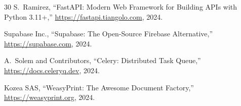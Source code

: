 \documentclass[conference]{IEEEtran}
\begin{document}
\begin{thebibliography}{30}
S.~Ramirez,
``FastAPI: Modern Web Framework for Building APIs with Python 3.11+,''
\url{https://fastapi.tiangolo.com}, 2024.

Supabase Inc.,
``Supabase: The Open-Source Firebase Alternative,''
\url{https://supabase.com}, 2024.

A.~Solem and Contributors,
``Celery: Distributed Task Queue,''
\url{https://docs.celeryq.dev}, 2024.

Kozea SAS,
``WeasyPrint: The Awesome Document Factory,''
\url{https://weasyprint.org}, 2024.

\end{thebibliography}
\end{document}
